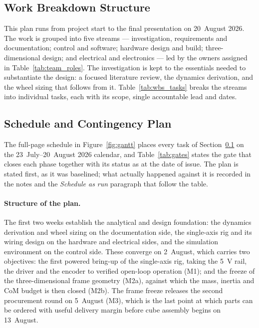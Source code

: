 \subsection{Work Breakdown Structure}
\label{sec:wbs}

This plan runs from project start to the final presentation on 20~August 2026.
The work is grouped into five streams --- investigation, requirements and
documentation; control and software; hardware design and build; three-dimensional
design; and electrical and electronics --- led by the owners assigned in
Table~\ref{tab:team_roles}. The investigation is kept to the essentials needed to
substantiate the design: a focused literature review, the dynamics derivation,
and the wheel sizing that follows from it. Table~\ref{tab:wbs_tasks} breaks the
streams into individual tasks, each with its scope, single accountable lead and
dates.



\subsection{Schedule and Contingency Plan}
\label{sec:schedule}

The full-page schedule in Figure~\ref{fig:gantt} places every task of
Section~\ref{sec:wbs} on the 23~July--20~August 2026 calendar, and
Table~\ref{tab:gates} states the gate that closes each phase together with its
status as at the date of issue. The plan is stated first, as it was baselined;
what actually happened against it is recorded in the notes and the
\emph{Schedule as run} paragraph that follow the table.

\paragraph{Structure of the plan.}
The first two weeks establish the analytical and design foundation: the dynamics
derivation and wheel sizing on the documentation side, the single-axis rig and
its wiring design on the hardware and electrical sides, and the simulation
environment on the control side. These converge on 2~August, which carries two
objectives: the first powered bring-up of the single-axis rig, taking the
\qty{5}{\volt} rail, the driver and the encoder to verified open-loop operation
(M1); and the freeze of the three-dimensional frame geometry (M2a), against
which the mass, inertia and CoM budget is then closed (M2b). The frame freeze
releases the second procurement round on 5~August (M3), which is the last point
at which parts can be ordered with useful delivery margin before cube assembly
begins on 13~August.

